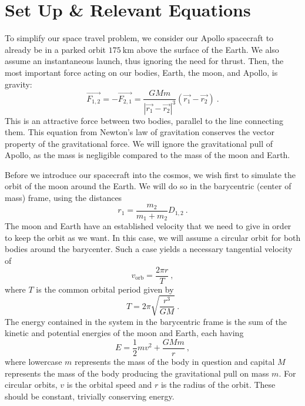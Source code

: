 \documentclass[aps,prl,twocolumn,superscriptaddress]{revtex4-1}
\newcommand{\paren}[1]{\left( #1 \right)} 	%
\newcommand{\cmod}[1]{\left| #1 \right|}	%
\begin{document}
\section{Set Up \& Relevant Equations}
To simplify our space travel problem, we consider our Apollo spacecraft to already be in a parked orbit $\SI{175}{\km}$ above the surface of the Earth. We also assume an instantaneous launch, thus ignoring the need for thrust. Then, the most important force acting on our bodies, Earth, the moon, and Apollo, is gravity:
\begin{equation}
\vec{F_{1,2}} = - \vec{F_{2,1}} = \frac{GMm}{\cmod{\vec{r_1} - \vec{r_2}}^3} \paren{\vec{r_1} - \vec{r_2}} ~.  \label{eq:grav}
\end{equation}
This is an attractive force between two bodies, parallel to the line connecting them. This equation from Newton's law of gravitation \cite{lab} conserves the vector property of the gravitational force. We will ignore the gravitational pull of Apollo, as the mass is negligible compared to the mass of the moon and Earth.

Before we introduce our spacecraft into the cosmos, we wish first to simulate the orbit of the moon around the Earth. We will do so in the barycentric (center of mass) frame, using the distances
\begin{equation}
r_1 = \frac{m_2}{m_1 + m_2} D_{1,2} ~. \label{eq:cmdist}
\end{equation}
The moon and Earth have an established velocity that we need to give in order to keep the orbit as we want. In this case, we will assume a circular orbit for both bodies around the barycenter. Such a case yields a necessary tangential velocity of
\begin{equation}
v_{\text{orb}} = \frac{2\pi r}{T} ~, \label{eq:orbvel}
\end{equation}
where $T$ is the common orbital period given by \cite{phys}
\begin{equation}
T = 2\pi \sqrt{\frac{r^3}{GM}} ~.  \label{eq:period}
\end{equation}
The energy contained in the system in the barycentric frame is the sum of the kinetic and potential energies of the moon and Earth, each having
\begin{equation}
E = \frac{1}{2} m v^2 + \frac{GMm}{r} ~, \label{energy}
\end{equation}
where lowercase $m$ represents the mass of the body in question and capital $M$ represents the mass of the body producing the gravitational pull on mass $m$. For circular orbits, $v$ is the orbital speed and $r$ is the radius of the orbit. These should be constant, trivially conserving energy.
\end{document}
